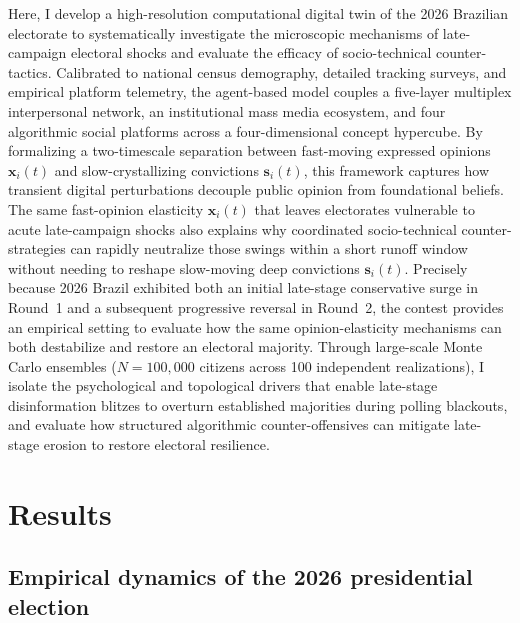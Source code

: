 \documentclass[11pt,a4paper]{article}
\begin{document}
Here, I develop a high-resolution computational digital twin of the 2026 Brazilian electorate to systematically investigate the microscopic mechanisms of late-campaign electoral shocks and evaluate the efficacy of socio-technical counter-tactics. Calibrated to national census demography, detailed tracking surveys, and empirical platform telemetry, the agent-based model couples a five-layer multiplex interpersonal network, an institutional mass media ecosystem, and four algorithmic social platforms across a four-dimensional concept hypercube. By formalizing a two-timescale separation between fast-moving expressed opinions $\mathbf{x}_i(t)$ and slow-crystallizing convictions $\mathbf{s}_i(t)$, this framework captures how transient digital perturbations decouple public opinion from foundational beliefs. The same fast-opinion elasticity $\mathbf{x}_i(t)$ that leaves electorates vulnerable to acute late-campaign shocks also explains why coordinated socio-technical counter-strategies can rapidly neutralize those swings within a short runoff window without needing to reshape slow-moving deep convictions $\mathbf{s}_i(t)$. Precisely because 2026 Brazil exhibited both an initial late-stage conservative surge in Round~1 and a subsequent progressive reversal in Round~2, the contest provides an empirical setting to evaluate how the same opinion-elasticity mechanisms can both destabilize and restore an electoral majority. Through large-scale Monte Carlo ensembles ($N = 100{,}000$ citizens across 100 independent realizations), I isolate the psychological and topological drivers that enable late-stage disinformation blitzes to overturn established majorities during polling blackouts, and evaluate how structured algorithmic counter-offensives can mitigate late-stage erosion to restore electoral resilience.

\section*{Results}

\subsection*{Empirical dynamics of the 2026 presidential election}
\end{document}

